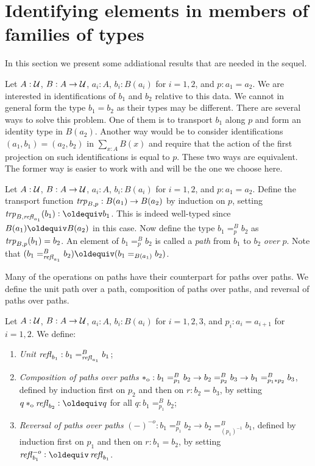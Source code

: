 \documentclass[a4,12pt]{amsart}
\begin{document}
\section{Identifying elements in members of families of types}
\label{sec:pathovers}

In this section we present some addiational results that are needed in the sequel.

Let $A : \mathcal{U}$, $B : A \to \mathcal{U}$, $a_i:A$, $b_i:B(a_i)$ for $i=1,2$, and $p : a_1 = a_2$.
We are interested in identifications of $b_1$ and $b_2$ relative to this data.
We cannot in general form the type $b_1 = b_2$ as their types may be different.
There are several ways to solve this problem. One of them is to transport $b_1$ along
$p$ and form an identity type in $B(a_2)$. Another way would be to consider
identifications $(a_1,b_1) = (a_2,b_2)$ in $\sum_{x:A} B(x)$ and require that the
action of the first projection on such identifications is equal to $p$. 
These two ways are equivalent.
The former way is easier to work with and will be the one we choose here.

\begin{definition}\label{def:pathover}
Let $A : \mathcal{U}$, $B : A \to \mathcal{U}$, $a_i:A$, $b_i:B(a_i)$ for $i=1,2$, and $p : a_1 = a_2$.
Define the transport function $\mathop{\mathit{trp}_{B,p}} : B(a_1)\to B(a_2)$ by induction on $p$,
setting $\trp{B,\refl{a_1}}(b_1)\defeq b_1$. This is indeed well-typed since
$B(a_1)\jdeq B(a_2)$ in this case.
Now define the type $b_1 =^B_p b_2$ as $\mathop{\mathit{trp}_{B,p}}(b_1) = b_2$.
An element of $b_1 =^B_p b_2$ is called
a \emph{path} from $b_1$ to $b_2$ \emph{over} $p$.
Note that $(b_1 =^B_{\refl{a_1}} b_2) \jdeq (b_1 =_{B(a_1)}  b_2)$.
\end{definition}

Many of the operations on paths have their counterpart for paths over paths.
We define the unit path over a path, composition of paths over paths, and reversal of paths over paths.

\begin{definition}\label{def:pathoveralgebra}
  Let $A : \mathcal{U}$, $B : A \to \mathcal{U}$, $a_i:A$, $b_i:B(a_i)$ for $i=1,2,3$, and 
  $p_i : a_i = a_{i+1}$ for $i=1,2$. We define:
  \begin{enumerate}[topsep=3pt]
  \item \emph{Unit} $\mathop{{\it refl}_{b_1}} : b_1 =^B_{\mathop{{\it refl}_{a_1}}} b_1$;
  \item \emph{Composition of paths over paths} $*_{\mathrm{o}} : b_1 =^B_{p_1} b_2 \to b_2 =^B_{p_2} b_3 \to b_1 =^B_{p_1 * p_2} b_3$,
    defined by induction first on $p_2$ and then on $r: b_2 = b_3$, by
    setting $q \cto \refl{b_2} \defeq q$ for all $q: b_1 =^B_{p_1} b_2$;
  \item \emph{Reversal of paths over paths} $({-})^{-o} : b_1 =^B_{p_1} b_2 \to b_2 =^B_{(p_1)^{-1}} b_1$,
    defined by induction first on $p_1$ and then on $r: b_1 = b_2$, by
    setting $\refloi{b_1} \defeq \refl{b_1}$.
  \end{enumerate}
\end{definition}
\end{document}
